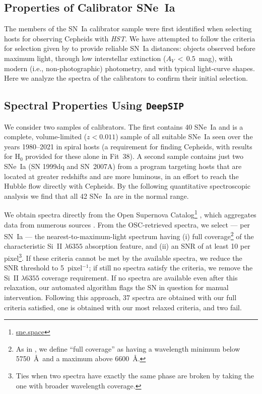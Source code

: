 \documentclass[12pt]{aastex631}
\begin{document}
\begin{appendices}
\section{Properties of Calibrator SNe~Ia\label{sc:appa}}

The members of the SN~Ia calibrator sample were first identified when selecting hosts for observing Cepheids with {\it HST}. We have attempted to follow the criteria for selection given by \cite{riess05} to provide reliable SN~Ia distances: objects observed before maximum light, through low interstellar extinction ($A_V\,<\,0.5$~mag), with modern (i.e., non-photographic) photometry, and with typical light-curve shapes.  Here we analyze the spectra of the calibrators to confirm their initial selection.
      
\subsection{Spectral Properties Using \texttt{DeepSIP}}

We consider two samples of calibrators. The first contains 40 SNe~Ia and is a complete, volume-limited ($z<0.011$) sample of all suitable SNe~Ia seen over the years 1980--2021 in spiral hosts (a requirement for finding Cepheids, with results for H$_0$ provided for these alone in Fit~38). A second sample contains just two SNe~Ia (SN 1999dq and SN~2007A) from a program targeting hosts that are located at greater redshifts and are more luminous, in an effort to reach the Hubble flow directly with Cepheids. By the following quantitative spectroscopic analysis we find that all 42 SNe~Ia are in the normal range.

We obtain spectra directly from the Open Supernova Catalog\footnote{\url{sne.space}} \citep[OSC;][]{openSNe}, which aggregates data from numerous sources \citep[including notable low-redshift SN~Ia spectroscopy releases; e.g.,][]{bsnipI,Blondin2012,Folatelli2013,S20}. From the OSC-retrieved spectra, we select --- per SN~Ia --- the nearest-to-maximum-light spectrum having (i) full coverage\footnote{As in \citet{S20}, we define ``full coverage'' as having a wavelength minimum below 5750~\AA\ and a maximum above 6600~\AA.} of the characteristic Si~II $\lambda 6355$ absorption feature, and (ii) an SNR of at least 10 per pixel\footnote{Ties when two spectra have exactly the same phase are broken by taking the one with broader wavelength coverage.}. If these criteria cannot be met by the available spectra, we reduce the SNR threshold to 5~pixel$^{-1}$; if still no spectra satisfy the criteria, we remove the Si~II $\lambda 6355$ coverage requirement. If no spectra are available even after this relaxation, our automated algorithm flags the SN in question for manual intervention. Following this approach, 37 spectra are obtained with our full criteria satisfied, one is obtained with our most relaxed criteria, and two fail.


\end{appendices}
\end{document}
